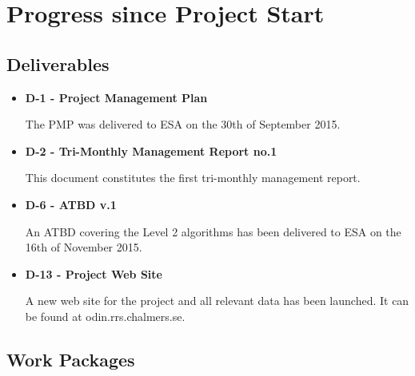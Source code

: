 \chapter{Progress since Project Start}
\label{chapter:progress}

\section{Deliverables}

\begin{itemize}

\item{\bf D-1 - Project Management Plan}

The PMP was delivered to ESA on the 30th of September 2015.

\item{\bf D-2 - Tri-Monthly Management Report no.1}

This document constitutes the first tri-monthly management report. 

\item{\bf D-6 - ATBD v.1}

An ATBD covering the Level 2 algorithms has been delivered to ESA on the 16th of November 2015.

\item{\bf D-13 - Project Web Site}

A new web site for the project and all relevant data has been launched. It can be found at odin.rrs.chalmers.se.

\end{itemize}

\section{Work Packages}

